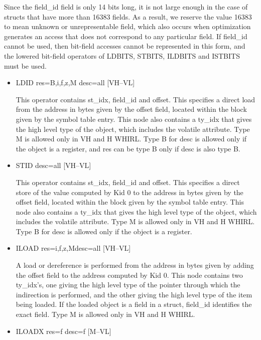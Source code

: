 \documentclass{article}
\begin{document}
Since the field\_id field is only 14 bits long, it is not large
enough in the case of structs that have more than 16383 fields. As
a result, we reserve the value 16383 to mean unknown or unrepresentable
field, which also occurs when optimization generates an access that
does not correspond to any particular field. If field\_id cannot be
used, then bit-field accesses cannot be represented in this form,
and the lowered bit-field operators of
LDBITS, STBITS, ILDBITS and ISTBITS must be used.

\begin{itemize}

\item  LDID res=B,i,f,z,M desc=all  \hfill [VH--VL]

This operator contains st\_idx, field\_id and offset. This specifies
a direct load from the address in bytes given by the offset field,
located within the
block given by the symbol table entry. This node also contains a
ty\_idx that gives the high level type of the object, which includes
the volatile attribute. Type M is allowed only in VH and H WHIRL.
Type B for desc is allowed only if the object is a register, and
res can be type B only if desc is also type B. 

\item  STID desc=all \hfill [VH--VL]

This operator contains st\_idx, field\_id and offset. This specifies
a direct store of the value computed by Kid 0 to the address in
bytes given by the
offset field, located within the block given by the symbol table
entry. This node also contains a ty\_idx that gives the high level
type of the object, which includes the volatile attribute. Type M
is allowed only in VH and H WHIRL. Type B for desc is allowed only
if the object is a register.

\item  ILOAD res=i,f,z,Mdesc=all \hfill [VH--VL]

A load or dereference is performed from the address in bytes given
by adding the offset field to the address computed by Kid 0. This
node contains two ty\_idx's, one giving the high level type of the
pointer through which the indirection is performed, and the other
giving the high level type of the item being loaded. If the loaded
object is a field in a struct, field\_id identifies the exact field.
Type M is allowed only in VH and H WHIRL. 

\item  ILOADX res=f desc=f \hfill [M--VL]


\end{itemize}
\end{document}
